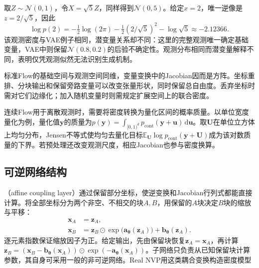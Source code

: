 \begin{example}[用缩放得到相同的一维密度]
  \label{ex:pgm-generative-gaussian-flow}
  取$Z\sim\mathcal{N}(0,1)$，令$X=\sqrt{5}Z$，同样得到$\mathcal{N}(0,5)$。给定$x=2$，唯一逆像是$z=2/\sqrt5$，因此
  \[
    \log p(2)=-\tfrac12\log(2\pi)
              -\tfrac12(2/\sqrt5)^2-\log\sqrt5
             \approx-2.12366.
  \]
  该观测密度与VAE例子相同，潜变量关系却不同：这里的完整观测唯一确定基础变量，VAE中则保留$\mathcal{N}(0.8,0.2)$的后验不确定性。观测分布相同而潜变量解释不同，表明仅凭观测似然无法识别生成机制。
\end{example}

标准Flow的基础空间与观测空间同维，变量变换中的Jacobian因而是方阵。坐标重排、分块输出和保留旁路变量可以改变张量形状，同时保留总自由度。丢弃坐标时需对它们边缘化；加入随机变量时则需规定扩展空间上的联合密度。

连续Flow用于离散观测时，需要将密度转换为量化区间的概率质量。以单位宽度量化为例，量化值$\bm{y}$的质量为$p(\bm{y})=\int_{[0,1)^d}p_{\mathrm{cont}}(\bm{y}+\bm{u})\,\mathrm{d}\bm{u}$。取$\bm{U}$在单位立方体上均匀分布，Jensen不等式使均匀去量化目标$\mathbb{E}_{\bm{U}}\log p_{\mathrm{cont}}(\bm{y}+\bm{U})$成为该对数质量的下界。若预处理还改变观测尺度，相应Jacobian也参与密度换算。

\subsection{可逆网络结构}
\label{sec:pgm-generative-invertible-networks}

（affine coupling layer）通过保留部分坐标，使逆变换和Jacobian行列式都能直接计算。将全部坐标分为两个非空、不相交的块$A,B$，用保留的$A$块决定$B$块的缩放与平移：
\begin{equation}
  \label{eq:pgm-generative-coupling}
  \begin{aligned}
    \bm{x}_A&=\bm{z}_A,\\
    \bm{x}_B&=\bm{z}_B\odot
       \exp\bigl(\bm{a}_{\bm{\theta}}(\bm{z}_A)\bigr)
          +\bm{b}_{\bm{\theta}}(\bm{z}_A).
  \end{aligned}
\end{equation}
逐元素指数保证缩放因子为正。给定输出，先由保留块恢复$\bm{z}_A=\bm{x}_A$，再计算$\bm{z}_B=(\bm{x}_B-\bm{b}_{\bm{\theta}}(\bm{x}_A))\odot\exp(-\bm{a}_{\bm{\theta}}(\bm{x}_A))$。子网络只负责从已知保留块计算参数，其自身可采用一般的非可逆网络。Real NVP用这类耦合变换构造密度模型

